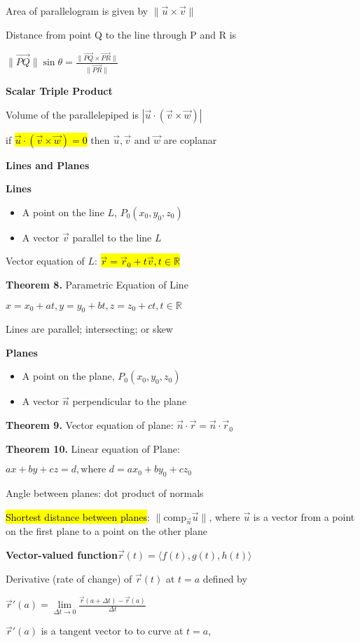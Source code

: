 \documentclass{article}
\newcommand{\headingsmall}[1]{{\small\textbf{#1}}}
\def\*#1{\vec{#1}}
\begin{document}
\begin{multicols*}{4}
Area of parallelogram is given by $\|\*u\times\*v\|$

Distance from point Q to the line through P and R is
\centerline{$\|\overrightarrow{PQ}\|\sin\theta=\frac{\|\overrightarrow{PQ}\times\overrightarrow{PR}\|}{\|\overrightarrow{PR}\|}$}
\textbf{Scalar Triple Product}

Volume of the parallelepiped is $|\*u\cdot(\*v\times\*w)|$

if \hl{$\*u\cdot(\*v\times\*w)=0$} then $\*u,\*v \text{ and }\*w$ are coplanar

\headingsmall{Lines and Planes}

\textbf{Lines}
\begin{itemize}[nosep]
	\item A point on the line $L$, $P_0(x_0,y_0,z_0)$
	\item A vector $\*v$ parallel to the line $L$
\end{itemize}
Vector equation of $L$: \hl{$\*r=\*r_0+t\*v, t\in\mathbb{R}$}

\textbf{Theorem 8.} Parametric Equation of Line

$x=x_0+at, y=y_0+bt, z=z_0+ct, t\in\mathbb{R}$

Lines are parallel; intersecting; or skew

\textbf{Planes}
\begin{itemize}[nosep]
	\item A point on the plane, $P_0(x_0,y_0,z_0)$
	\item A vector $\*n$ perpendicular to the plane
\end{itemize}
\textbf{Theorem 9.} Vector equation of plane: $\*n\cdot\*r=\*n\cdot\*r_0$

\textbf{Theorem 10.} Linear equation of Plane:

$ax+by+cz=d, \text{where } d=ax_0+by_0+cz_0$

Angle between planes: dot product of normals

\hl{Shortest distance between planes}: $\|\text{comp}_{\*n}\*u\|$, where $\*u$ is a vector from a point on the first plane to a point on the other plane

\vfill\null
\columnbreak

\headingsmall{Vector-valued function}$\*r(t)=\langle f(t), g(t), h(t) \rangle$

Derivative (rate of change) of $\*r(t)$ at $t=a$ defined by 
\centerline{$\*r'(a)=\lim\limits_{\Delta t\to0} \frac{\*r(a+\Delta t)-\*r(a)}{\Delta t}$}

$\*r'(a)$ is a tangent vector to to curve at $t=a$, 


\end{multicols*}
\end{document}
